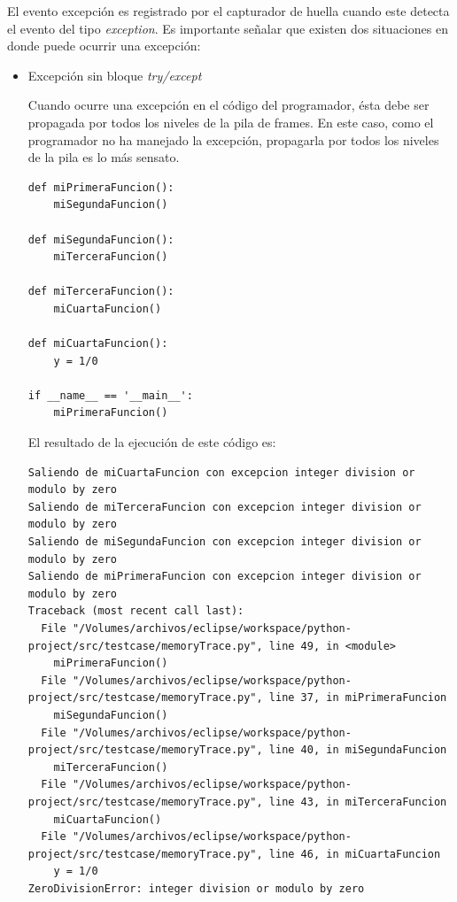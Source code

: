 \documentclass[12pt,legalpaper]{report}
\begin{document}
El evento excepción es registrado por el capturador de huella cuando este detecta el evento del tipo \textit{exception}.  Es importante señalar que existen dos situaciones en donde puede ocurrir una excepción:

\begin{itemize}
	\item Excepción sin bloque \textit{try/except}

Cuando ocurre una excepción en el código del programador, ésta debe ser propagada por todos los niveles de la pila de frames.  En este caso, como el programador no ha manejado la excepción, propagarla por todos los niveles de la pila es lo más sensato.

\begin{singlespace}
\begin{lstlisting}[style=Python]
def miPrimeraFuncion():
    miSegundaFuncion()
    
def miSegundaFuncion():
    miTerceraFuncion()

def miTerceraFuncion():
    miCuartaFuncion()

def miCuartaFuncion():
    y = 1/0

if __name__ == '__main__':
    miPrimeraFuncion()
\end{lstlisting}
\end{singlespace}

El resultado de la ejecución de este código es:

\begin{singlespace}
\begin{lstlisting}[style=consola,numbers=none]
Saliendo de miCuartaFuncion con excepcion integer division or modulo by zero
Saliendo de miTerceraFuncion con excepcion integer division or modulo by zero
Saliendo de miSegundaFuncion con excepcion integer division or modulo by zero
Saliendo de miPrimeraFuncion con excepcion integer division or modulo by zero
Traceback (most recent call last):
  File "/Volumes/archivos/eclipse/workspace/python-project/src/testcase/memoryTrace.py", line 49, in <module>
    miPrimeraFuncion()
  File "/Volumes/archivos/eclipse/workspace/python-project/src/testcase/memoryTrace.py", line 37, in miPrimeraFuncion
    miSegundaFuncion()
  File "/Volumes/archivos/eclipse/workspace/python-project/src/testcase/memoryTrace.py", line 40, in miSegundaFuncion
    miTerceraFuncion()
  File "/Volumes/archivos/eclipse/workspace/python-project/src/testcase/memoryTrace.py", line 43, in miTerceraFuncion
    miCuartaFuncion()
  File "/Volumes/archivos/eclipse/workspace/python-project/src/testcase/memoryTrace.py", line 46, in miCuartaFuncion
    y = 1/0
ZeroDivisionError: integer division or modulo by zero
\end{lstlisting}
\end{singlespace}	



\end{itemize}
\end{document}
